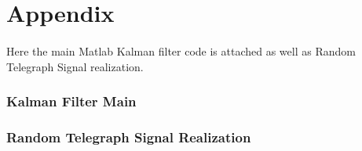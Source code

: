 \section{Appendix}
\paragraph{}
Here the main Matlab Kalman filter code is attached as well as Random Telegraph Signal realization.
\subsubsection{Kalman Filter Main}

\subsubsection{Random Telegraph Signal Realization}
